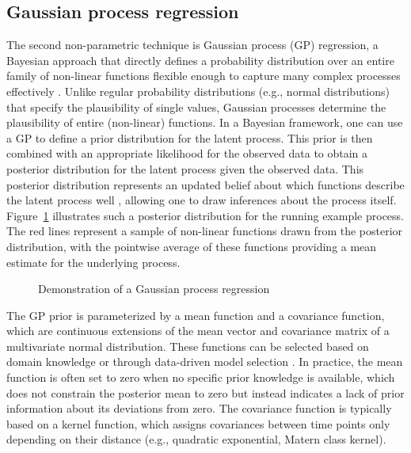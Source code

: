 \documentclass[man, floatsintext]{apa7}
\begin{document}
\subsection{Gaussian process regression}

The second non-parametric technique is Gaussian process (GP) regression, a
Bayesian approach that directly defines a probability distribution over an
entire family of non-linear functions flexible enough to capture many complex
processes effectively \parencite{rasmussen_gaussian_2006,
  betancourt_robust_2020, roberts_gaussian_2013}. Unlike regular probability
distributions (e.g., normal distributions) that specify the plausibility of
single values, Gaussian processes determine the plausibility of entire
(non-linear) functions. In a Bayesian framework, one can use a GP to define
a prior distribution for the latent process. This prior is then combined
with an appropriate likelihood for the observed data to obtain a posterior
distribution for the latent process given the observed data.
This posterior distribution represents an updated belief about which functions
describe the latent process well
\parencite{kruschke_doing_2011}, allowing one to draw inferences about the
process itself. Figure~\ref{fig:gp_dem} illustrates such a posterior
distribution for the running
example process. The red lines represent a sample of non-linear functions
drawn from the posterior distribution, with the pointwise average of these
functions providing a mean estimate for the underlying process.

\begin{figure}[!ht]
  \caption{Demonstration of a Gaussian process regression}
  \label{fig:gp_dem}
\end{figure}

The GP prior is parameterized by a mean function and a covariance function,
which are continuous extensions of the mean vector and covariance matrix of a
multivariate normal distribution. These functions can be selected based on
domain knowledge or through data-driven model selection
\parencite{richardson_gaussian_2017, abdessalem_automatic_2017}. In practice,
the mean function is often set to zero when no specific prior knowledge is
available, which does not constrain the posterior mean to zero but instead
indicates a lack of prior information about its deviations from zero.
The covariance function is typically based on a kernel function, which assigns
covariances between time points only depending on their distance
(e.g., quadratic exponential, Matern class kernel).
\end{document}
